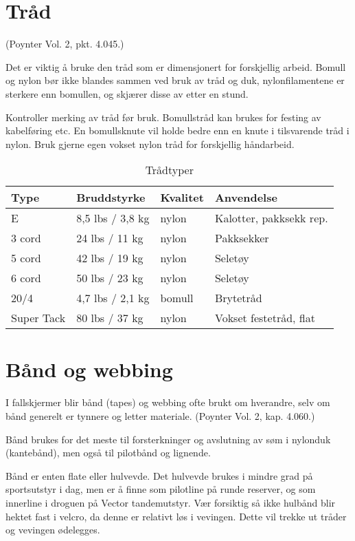 \section{Tråd}
(Poynter Vol. 2, pkt. 4.045.)

Det er viktig å bruke den tråd som er dimensjonert for forskjellig arbeid. Bomull og nylon bør ikke blandes sammen ved bruk av tråd og duk, nylonfilamentene er sterkere enn bomullen, og skjærer disse av etter en stund.

Kontroller merking av tråd før bruk. Bomullstråd kan brukes for festing av kabelføring etc. En bomullsknute vil holde bedre enn en knute i tilsvarende tråd i nylon. Bruk gjerne egen vokset nylon tråd for forskjellig håndarbeid.

\begin{table}
	\caption{Trådtyper}
	\begin{tabular}{ | l | l | l | l | }
		\hline
		Type & Bruddstyrke & Kvalitet & Anvendelse \\
		\hline
		E & 8,5 lbs / 3,8 kg & nylon & Kalotter, pakksekk rep. \\
		\hline
		3 cord & 24 lbs / 11 kg & nylon & Pakksekker \\
		\hline
		5 cord & 42 lbs / 19 kg & nylon & Seletøy \\
		\hline
		6 cord & 50 lbs / 23 kg & nylon & Seletøy \\
		\hline
		20/4 & 4,7 lbs / 2,1 kg & bomull & Brytetråd \\
		\hline
		Super Tack & 80 lbs / 37 kg & nylon & Vokset festetråd, flat \\
		\hline
	\end{tabular}
\end{table}

\section{Bånd og webbing}
I fallskjermer blir bånd (tapes) og webbing ofte brukt om hverandre, selv om bånd generelt er tynnere og letter materiale. (Poynter Vol. 2, kap. 4.060.)

Bånd brukes for det meste til forsterkninger og avslutning av søm i nylonduk (kantebånd), men også til pilotbånd og lignende.

Bånd er enten flate eller hulvevde. Det hulvevde brukes i mindre grad på sportsutstyr i dag, men er å finne som pilotline på runde reserver, og som innerline i droguen på Vector tandemutstyr. Vær forsiktig så ikke hulbånd blir hektet fast i velcro, da denne er relativt løs i vevingen. Dette vil trekke ut tråder og vevingen ødelegges.

